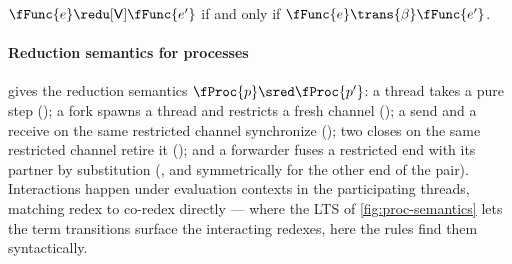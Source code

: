 \begin{lemma}
  \label{lem:vred-reduction}
  $\fFunc{e} \redu[\mathsf{V}] \fFunc{e'}$
  if and only if
  $\fFunc{e} \trans{\beta} \fFunc{e'}$.
\end{lemma}

\paragraph{Reduction semantics for processes}
 gives the reduction semantics
$\fProc{p} \sred \fProc{p'}$: a thread takes a pure step
(); a fork spawns a thread and restricts a fresh
channel (); a send and a receive on the same
restricted channel synchronize (); two closes on the
same restricted channel retire it (); and a
forwarder fuses a restricted end with its partner by substitution
(, and symmetrically for the other end of the
pair). Interactions happen under evaluation contexts in the
participating threads, matching redex to co-redex directly --- where
the LTS of \cref{fig:proc-semantics} lets the term transitions
surface the interacting redexes, here the rules find them
syntactically.

